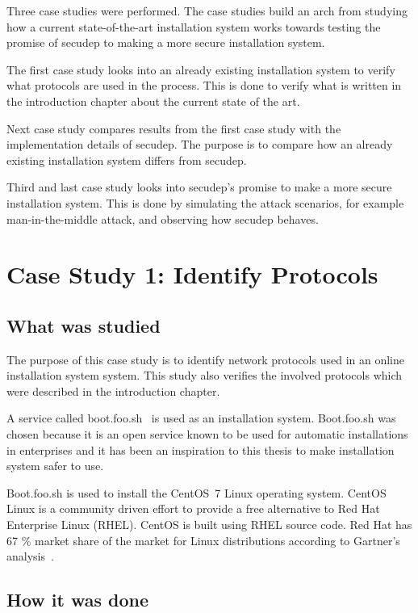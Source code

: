 
Three case studies were performed. The case studies build an arch from
studying how a current state-of-the-art installation system works
towards testing the promise of secudep to making a more secure
installation system.

The first case study looks into an already existing installation
system to verify what protocols are used in the process. This is done
to verify what is written in the introduction chapter about the
current state of the art.

Next case study compares results from the first case study with the
implementation details of secudep. The purpose is to compare how
an already existing installation system differs from secudep.

Third and last case study looks into secudep's promise to make a more
secure installation system. This is done by simulating the attack
scenarios, for example man-in-the-middle attack, and observing how
secudep behaves.


\section{Case Study 1: Identify Protocols}
\label{sec:casestudy1}

\subsection{What was studied}

The purpose of this case study is to identify network protocols used
in an online installation system system. This study also verifies the
involved protocols which were described in the introduction chapter.

A service called boot.foo.sh~\cite{boot-foo-sh} is used as an
installation system. Boot.foo.sh was chosen because it is an open
service known to be used for automatic installations in enterprises
and it has been an inspiration to this thesis to make installation
system safer to use.

Boot.foo.sh is used to install the CentOS~7 Linux operating
system. CentOS Linux is a community driven effort to provide a free
alternative to Red Hat Enterprise Linux (RHEL). CentOS is built using
RHEL source code. Red Hat has 67 \% market share of the market for
Linux distributions according to Gartner's
analysis~\cite{gartner-redhat}.

\subsection{How it was done}

